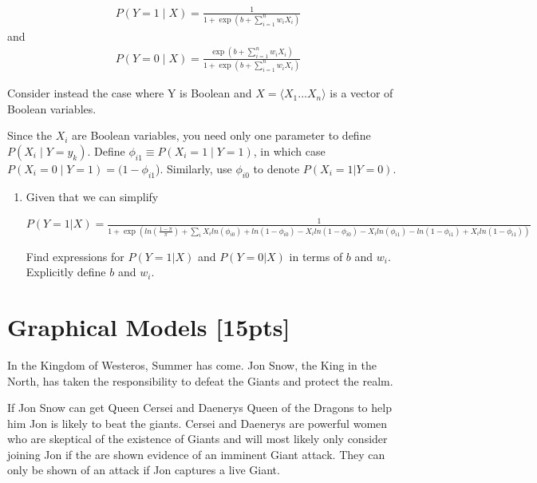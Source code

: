 \documentclass[11pt,addpoints,answers]{exam}
\begin{document}
\begin{enumerate}
\begin{align*}
    P(Y=1\mid X)=\frac{1}{1+\exp(b+\sum_{i=1}^{n} w_i X_i)}
\end{align*}
and
\begin{align*}
    P(Y=0\mid X)=\frac{\exp(b+\sum_{i=1}^{n} w_iX_i)}{1+\exp(b+\sum_{i=1}^{n} w_iX_i)}
\end{align*}

 Consider instead the case where Y is Boolean and ${ X = \langle{X_{1}...X_{n}}}\rangle$ is a vector
of Boolean variables.


Since the $X_{i}$ are Boolean variables, you need only one parameter to define $P(X_{i}\mid{Y} = y_k)$. Define $\phi_{i1} \equiv P(X_{i} = 1\mid{Y = 1})$, in which case $P(X_{i} = 0\mid{Y = 1}) = (1-\phi_{i1}$). Similarly, use $\phi_{i0}$ to denote $P(X_{i} = 1|Y = 0)$. 

\begin{enumerate}
    \item Given that we can simplify 
        
        $P(Y=1|X) = \frac{1}{1+\exp(ln(\frac{1-\pi}{\pi}) +\sum_i X_iln(\phi_{i0}) + ln(1-\phi_{i0}) - X_iln(1-\phi_{i0}) - X_iln(\phi_{i1}) - ln(1-\phi_{i1}) + X_iln(1-\phi_{i1}))}$ 
        
        Find expressions for $P(Y=1|X)$ and $P(Y=0|X)$ in terms of $b$ and $w_i$. Explicitly define $b$ and $w_i$.
        
        \begin{tcolorbox}[fit,height=10cm, blank, borderline={1pt}{-2pt},nobeforeafter]
    
    \end{tcolorbox}
        
\end{enumerate}




\end{enumerate}\clearpage

\section{Graphical Models [15pts]}

In the Kingdom of Westeros, Summer has come. Jon Snow, the King in the North, has taken the responsibility to defeat the Giants and protect the realm.

If Jon Snow can get Queen Cersei and Daenerys Queen of the Dragons to help him Jon is likely to beat the giants. Cersei and Daenerys are powerful women who are skeptical of the existence of Giants and will most likely only consider joining Jon if the are shown evidence of an imminent Giant attack. They can only be shown of an attack if Jon captures a live Giant.
\end{document}
